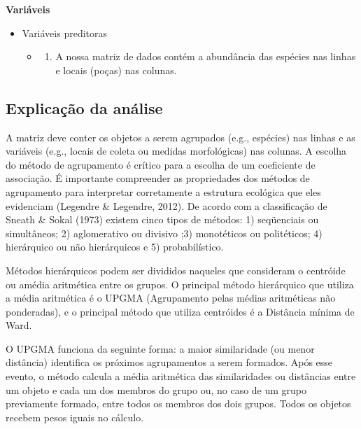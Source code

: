 \documentclass[
]{book}
\providecommand{\tightlist}{%
  \setlength{\itemsep}{0pt}\setlength{\parskip}{0pt}}
\begin{document}
\textbf{Variáveis}

\begin{itemize}
\tightlist
\item
  Variáveis preditoras

  \begin{itemize}
  \item
    \begin{enumerate}
    \def\labelenumi{\arabic{enumi}.}
    \tightlist
    \item
      A nossa matriz de dados contém a abundância das espécies nas linhas e locais (poças) nas colunas.
    \end{enumerate}
  \end{itemize}
\end{itemize}

\hypertarget{explicauxe7uxe3o-da-anuxe1lise}{%
\subsection{Explicação da análise}\label{explicauxe7uxe3o-da-anuxe1lise}}

A matriz deve conter os objetos a serem agrupados (e.g., espécies) nas linhas e as variáveis (e.g., locais de coleta ou medidas morfológicas) nas colunas.
A escolha do método de agrupamento é crítico para a escolha de um coeficiente de associação. É importante compreender as propriedades dos métodos de agrupamento para interpretar corretamente a estrutura ecológica que eles evidenciam (Legendre \& Legendre, 2012). De acordo com a classificação de Sneath \& Sokal (1973) existem cinco tipos de métodos: 1) seqüenciais ou simultâneos; 2) aglomerativo ou divisivo ;3) monotéticos ou politéticos; 4) hierárquico ou não hierárquicos e 5) probabilístico.

Métodos hierárquicos podem ser divididos naqueles que consideram o centróide ou amédia aritmética entre os grupos. O principal método hierárquico que utiliza a média aritmética é o UPGMA (Agrupamento pelas médias aritméticas não ponderadas), e o principal método que utiliza centróides é a Distância mínima de Ward.

O UPGMA funciona da seguinte forma: a maior similaridade (ou menor distância) identifica os próximos agrupamentos a serem formados. Após esse evento, o método calcula a média aritmética das similaridades ou distâncias entre um objeto e cada um dos membros do grupo ou, no caso de um grupo previamente formado, entre todos os membros dos dois grupos. Todos os objetos recebem pesos iguais no cálculo.
\end{document}
